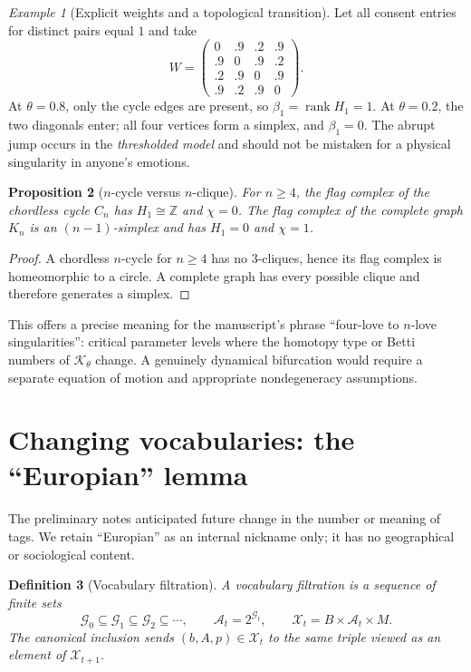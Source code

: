 \documentclass[11pt,a4paper]{article}
\numberwithin{equation}{section}
\newtheorem{definition}{Definition}[section]
\newtheorem{proposition}[definition]{Proposition}
\theoremstyle{remark}
\newtheorem{example}[definition]{Example}
\newcommand{\Z}{\mathbb{Z}}
\newcommand{\G}{\mathcal{G}}
\newcommand{\A}{\mathcal{A}}
\newcommand{\X}{\mathcal{X}}
\newcommand{\K}{\mathcal{K}}
\newcommand{\1}{\mathbf{1}}
\newcommand{\rank}{\operatorname{rank}}
\begin{document}
\begin{example}[Explicit weights and a topological transition]
Let all consent entries for distinct pairs equal $1$ and take
\begin{equation}\label{eq:W4}
W=\begin{pmatrix}
0&.9&.2&.9\\
.9&0&.9&.2\\
.2&.9&0&.9\\
.9&.2&.9&0
\end{pmatrix}.
\end{equation}
At $\theta=0.8$, only the cycle edges are present, so
$\beta_1=\rank H_1=1$.  At $\theta=0.2$, the two diagonals
enter; all four vertices form a simplex, and $\beta_1=0$.
The abrupt jump occurs in the \emph{thresholded model} and should
not be mistaken for a physical singularity in anyone's emotions.
\end{example}

\begin{proposition}[$n$-cycle versus $n$-clique]
For $n\ge4$, the flag complex of the chordless cycle $C_n$ has
$H_1\cong\Z$ and $\chi=0$.  The flag complex of the complete graph
$K_n$ is an $(n-1)$-simplex and has $H_1=0$ and $\chi=1$.
\end{proposition}
\begin{proof}
A chordless $n$-cycle for $n\ge4$ has no $3$-cliques, hence its flag
complex is homeomorphic to a circle.  A complete graph has every
possible clique and therefore generates a simplex.
\end{proof}

This offers a precise meaning for the manuscript's phrase
``four-love to $n$-love singularities'': critical parameter levels
where the homotopy type or Betti numbers of $\K_\theta$ change.
A genuinely dynamical bifurcation would require a separate equation
of motion and appropriate nondegeneracy assumptions.

\section{Changing vocabularies: the ``Europian'' lemma}

The preliminary notes anticipated future change in the number or
meaning of tags.  We retain ``Europian'' as an internal nickname only;
it has no geographical or sociological content.

\begin{definition}[Vocabulary filtration]
A vocabulary filtration is a sequence of finite sets
\begin{equation}\label{eq:Gfiltration}
\G_0\subseteq\G_1\subseteq\G_2\subseteq\cdots,
\qquad \A_t=2^{\G_t},\qquad \X_t=B\times\A_t\times M.
\end{equation}
The canonical inclusion sends $(b,A,p)\in\X_t$ to the same triple
viewed as an element of $\X_{t+1}$.
\end{definition}
\end{document}
